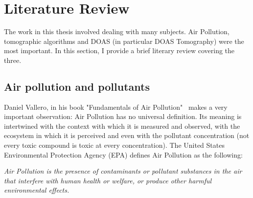 \chapter{Literature Review}
\label{cha:literature_review}

The work in this thesis involved dealing with many subjects. Air
Pollution, tomographic algorithms and DOAS (in particular DOAS
Tomography) were the most important. In this section, I provide a brief
literary review covering the three.

\section{Air pollution and pollutants}%
\label{sec:air_pollution_and_pollutants}

Daniel Vallero, in his book "Fundamentals of Air
Pollution"~\cite{Vallero2014} makes a very important observation: Air
Pollution has no universal definition. Its meaning is intertwined with
the context with which it is measured and observed, with the ecosystem
in which it is perceived and even with the pollutant concentration (not
every toxic compound is toxic at every concentration). The United States
Environmental Protection Agency (\gls{EPA}) defines Air Pollution as the
following:

\begin{center}
    \begin{minipage}{0.8\textwidth}

        \noindent
            \textit{Air Pollution is the presence of contaminants or pollutant
            substances in the air that interfere with human health or welfare,
            or produce other harmful environmental effects.}

    \end{minipage}
\end{center}

